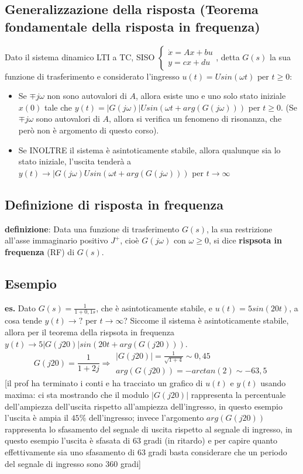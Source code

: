 \subsection{Generalizzazione della risposta (Teorema fondamentale della risposta in frequenza)}
Dato il sistema dinamico LTI a TC, SISO $\begin{cases}
    \dot{x} = Ax +bu\\ 
    y = cx +du
\end{cases}$, detta $G(s)$ la sua funzione di trasferimento e considerato l'ingresso $u(t) = U sin(\omega t)$ per $t\geq 0$:
\begin{itemize}
    \item Se $\mp j \omega$ non sono autovalori di $A$, allora esiste uno e uno solo stato iniziale $x(0)$ tale che $y(t) = |G(j \omega)| U sin(\omega t + arg(G(j \omega)))$ per $t\geq 0$. (Se $\mp j \omega$ sono autovalori di $A$, allora si verifica un fenomeno di risonanza, che però non è argomento di questo corso).
    \item Se INOLTRE il sistema è asintoticamente stabile, allora qualunque sia lo stato iniziale, l'uscita  tenderà a $y(t) \rightarrow |G(j \omega) U sin( \omega t + arg(G(j \omega)))$ per $t \rightarrow  \infty$
\end{itemize}
\subsection{Definizione di risposta in frequenza}
\textbf{definizione}:  Data una funzione di trasferimento $G(s)$, la sua restrizione all'asse immaginario positivo $J^+$, cioè $G(j \omega)$ con $\omega \geq 0$, si dice \textbf{rispsota in frequenza} (RF) di $G(s)$.
\subsection{Esempio}
\textbf{es.} Dato $G(s) = \frac{1}{1+0,1 s}$, che è asintoticamente stabile, e $u(t) = 5 sin(20 t)$, a cosa tende $y(t) \rightarrow ?$ per $t \rightarrow \infty$?\newline
\newline
Siccome il sistema è asintoticamente stabile, allora per il teorema della rispsota in frequenza $y(t) \rightarrow 5 |G(j 20)| sin(20 t + arg(G(j 20)))$.
\[
    G(j 20) = \frac{1}{1 + 2j} \Rightarrow \begin{matrix}
        |G(j 20)| = \frac{1}{\sqrt{1+4}} \sim  0,45\\
        arg(G(j 20)) = -arctan(2) \sim  -63,5
    \end{matrix}
\]
[il prof ha terminato i conti e ha tracciato un grafico di $u(t)$ e $y(t)$ usando maxima: ci sta mostrando che il modulo $|G(j 20)|$ rappresenta la percentuale dell'ampiezza dell'uscita rispetto all'ampiezza dell'ingresso, in questo esempio l'uscita è ampia il $45\%$ dell'ingresso; invece l'argomento $arg(G(j 20))$ rappresenta lo sfasamento del segnale di uscita rispetto al segnale di ingresso, in questo esempio l'uscita è sfasata di $63$ gradi (in ritardo) e per capire quanto effettivamente sia uno sfasamento di $63$ gradi basta considerare che un periodo del segnale di ingresso sono $360$ gradi]
\newpage
